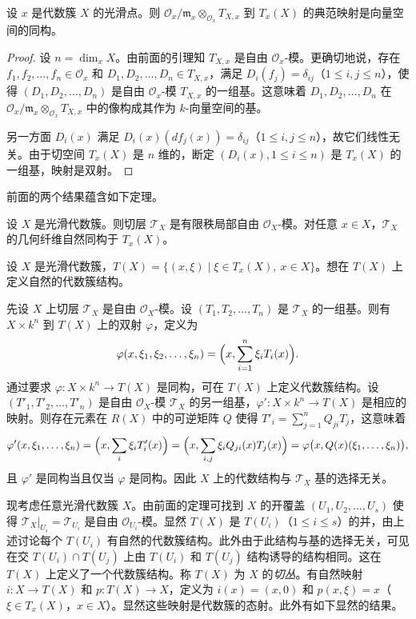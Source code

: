 \begin{proposition}
设 $x$ 是代数簇 $X$ 的光滑点。则 $\mathcal{O}_x/\mathfrak{m}_x\otimes_{\mathcal{O}_x}T_{X,x}$ 到 $T_x(X)$ 的典范映射是向量空间的同构。
\end{proposition}

\begin{proof}
设 $n=\dim_xX$。由前面的引理知 $T_{X,x}$ 是自由 $\mathcal{O}_x$-模。更确切地说，存在 $f_1,f_2,\dots,f_n\in\mathcal{O}_x$ 和 $D_1,D_2,\dots,D_n\in T_{X,x}$，满足 $D_i(f_j)=\delta_{ij}$（$1\le i,j\le n$），使得 $(D_1,D_2,\dots,D_n)$ 是自由 $\mathcal{O}_x$-模 $T_{X,x}$ 的一组基。这意味着 $D_1,D_2,\dots,D_n$ 在 $\mathcal{O}_x/\mathfrak{m}_x\otimes_{\mathcal{O}_x}T_{X,x}$ 中的像构成其作为 $k$-向量空间的基。

另一方面 $D_i(x)$ 满足 $D_i(x)(df_j(x))=\delta_{ij}$（$1\le i,j\le n$），故它们线性无关。由于切空间 $T_x(X)$ 是 $n$ 维的，断定 $(D_i(x),1\le i\le n)$ 是 $T_x(X)$ 的一组基，映射是双射。
\end{proof}

前面的两个结果蕴含如下定理。

\begin{theorem}
设 $X$ 是光滑代数簇。则切层 $\mathcal{T}_X$ 是有限秩局部自由 $\mathcal{O}_X$-模。对任意 $x\in X$，$\mathcal{T}_X$ 的几何纤维自然同构于 $T_x(X)$。
\end{theorem}

设 $X$ 是光滑代数簇，$T(X)=\{(x,\xi)\mid \xi\in T_x(X),\ x\in X\}$。想在 $T(X)$ 上定义自然的代数簇结构。

先设 $X$ 上切层 $\mathcal{T}_X$ 是自由 $\mathcal{O}_X$-模。设 $(T_1,T_2,\dots,T_n)$ 是 $\mathcal{T}_X$ 的一组基。则有 $X\times k^n$ 到 $T(X)$ 上的双射 $\varphi$，定义为
$$\varphi(x,\xi_1,\xi_2,\dots,\xi_n)=\Bigl(x,\sum_{i=1}^n\xi_iT_i(x)\Bigr).$$
通过要求 $\varphi:X\times k^n\to T(X)$ 是同构，可在 $T(X)$ 上定义代数簇结构。设 $(T'_1,T'_2,\dots,T'_n)$ 是自由 $\mathcal{O}_X$-模 $\mathcal{T}_X$ 的另一组基，$\varphi':X\times k^n\to T(X)$ 是相应的映射。则存在元素在 $R(X)$ 中的可逆矩阵 $Q$ 使得 $T'_i=\sum_{j=1}^nQ_{ji}T_j$，这意味着
$$\varphi'(x,\xi_1,\dots,\xi_n)=\Bigl(x,\sum_i\xi_iT'_i(x)\Bigr)=\Bigl(x,\sum_{i,j}\xi_iQ_{ji}(x)T_j(x)\Bigr)=\varphi\bigl(x,Q(x)(\xi_1,\dots,\xi_n)\bigr),$$
且 $\varphi'$ 是同构当且仅当 $\varphi$ 是同构。因此 $X$ 上的代数结构与 $\mathcal{T}_X$ 基的选择无关。

现考虑任意光滑代数簇 $X$。由前面的定理可找到 $X$ 的开覆盖 $(U_1,U_2,\dots,U_s)$ 使得 $\mathcal{T}_X|_{U_i}=\mathcal{T}_{U_i}$ 是自由 $\mathcal{O}_{U_i}$-模。显然 $T(X)$ 是 $T(U_i)$（$1\le i\le s$）的并，由上述讨论每个 $T(U_i)$ 有自然的代数簇结构。此外由于此结构与基的选择无关，可见在交 $T(U_i)\cap T(U_j)$ 上由 $T(U_i)$ 和 $T(U_j)$ 结构诱导的结构相同。这在 $T(X)$ 上定义了一个代数簇结构。称 $T(X)$ 为 $X$ 的\emph{切丛}。有自然映射 $i:X\to T(X)$ 和 $p:T(X)\to X$，定义为 $i(x)=(x,0)$ 和 $p(x,\xi)=x$（$\xi\in T_x(X)$，$x\in X$）。显然这些映射是代数簇的态射。此外有如下显然的结果。

